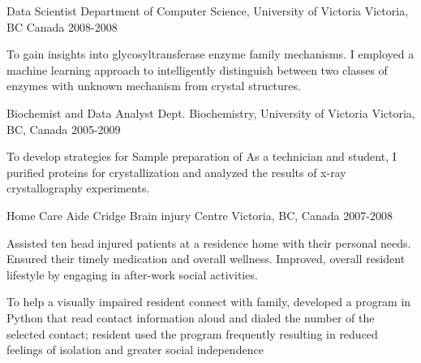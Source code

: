 


\begin{cventries}

\cventry
{Data Scientist} %
{Department of Computer Science, University of Victoria} %
{Victoria, BC Canada} %
{2008-2008} %
{ %
\begin{cvitems}
\item {To gain insights into glycosyltransferase enzyme family mechanisms. I employed a machine learning approach to intelligently distinguish between two classes of enzymes with unknown mechanism from crystal structures.}
\end{cvitems}
}


\cventry
{Biochemist and Data Analyst} %
{Dept. Biochemistry, University of Victoria} %
{Victoria, BC, Canada} %
{2005-2009} %
{ %
\begin{cvitems}
\item {To develop strategies for Sample preparation of As a technician and student, I purified proteins for crystallization and analyzed the results of x-ray crystallography experiments.}
\end{cvitems}
}


\cventry
{Home Care Aide} %
{Cridge Brain injury Centre} %
{Victoria, BC, Canada} %
{2007-2008} %
{ %
\begin{cvitems}
\item {Assisted ten head injured patients at a residence home with their personal needs. Ensured their timely medication and overall wellness. Improved, overall resident lifestyle by engaging in after-work social activities.}
\item {To help a visually impaired resident connect with family, developed a program in Python that read contact information aloud and dialed the number of the selected contact; resident used the program frequently resulting in reduced feelings of isolation and greater social independence}
\end{cvitems} 
}


\end{cventries}
